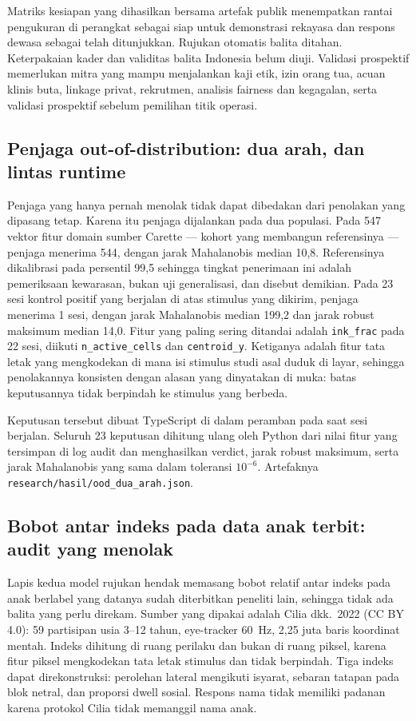 \documentclass{article}
\begin{document}
Matriks kesiapan yang dihasilkan bersama artefak publik menempatkan rantai pengukuran di
perangkat sebagai siap untuk demonstrasi rekayasa dan respons dewasa sebagai telah
ditunjukkan. Rujukan otomatis balita ditahan. Keterpakaian kader dan validitas balita
Indonesia belum diuji. Validasi prospektif memerlukan mitra yang mampu menjalankan kaji
etik, izin orang tua, acuan klinis buta, linkage privat, rekrutmen, analisis fairness dan
kegagalan, serta validasi prospektif sebelum pemilihan titik operasi.

\subsection{Penjaga out-of-distribution: dua arah, dan lintas runtime}

Penjaga yang hanya pernah menolak tidak dapat dibedakan dari penolakan yang dipasang tetap.
Karena itu penjaga dijalankan pada dua populasi. Pada 547 vektor fitur domain sumber Carette
--- kohort yang membangun referensinya --- penjaga menerima 544, dengan jarak Mahalanobis
median 10,8. Referensinya dikalibrasi pada persentil 99,5 sehingga tingkat penerimaan ini
adalah pemeriksaan kewarasan, bukan uji generalisasi, dan disebut demikian. Pada 23 sesi
kontrol positif yang berjalan di atas stimulus yang dikirim, penjaga menerima 1 sesi, dengan
jarak Mahalanobis median 199,2 dan jarak robust maksimum median 14,0. Fitur yang paling
sering ditandai adalah \texttt{ink\_frac} pada 22 sesi, diikuti \texttt{n\_active\_cells} dan
\texttt{centroid\_y}. Ketiganya adalah fitur tata letak yang mengkodekan di mana isi stimulus
studi asal duduk di layar, sehingga penolakannya konsisten dengan alasan yang dinyatakan di
muka: batas keputusannya tidak berpindah ke stimulus yang berbeda.

Keputusan tersebut dibuat TypeScript di dalam peramban pada saat sesi berjalan. Seluruh 23
keputusan dihitung ulang oleh Python dari nilai fitur yang tersimpan di log audit dan
menghasilkan verdict, jarak robust maksimum, serta jarak Mahalanobis yang sama dalam
toleransi $10^{-6}$. Artefaknya \texttt{research/hasil/ood\_dua\_arah.json}.

\subsection{Bobot antar indeks pada data anak terbit: audit yang menolak}

Lapis kedua model rujukan hendak memasang bobot relatif antar indeks pada anak berlabel yang
datanya sudah diterbitkan peneliti lain, sehingga tidak ada balita yang perlu direkam. Sumber
yang dipakai adalah Cilia dkk.~2022 (CC BY 4.0): 59 partisipan usia 3--12 tahun, eye-tracker
60~Hz, 2,25 juta baris koordinat mentah. Indeks dihitung di ruang perilaku dan bukan di ruang
piksel, karena fitur piksel mengkodekan tata letak stimulus dan tidak berpindah. Tiga indeks
dapat direkonstruksi: perolehan lateral mengikuti isyarat, sebaran tatapan pada blok netral,
dan proporsi dwell sosial. Respons nama tidak memiliki padanan karena protokol Cilia tidak
memanggil nama anak.
\end{document}
